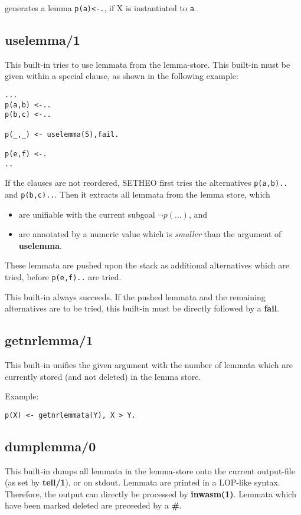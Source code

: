 generates a lemma {\tt p(a)<-.}, if X is instantiated to {\tt a}.


\subsection{uselemma/1}

This built-in tries to use lemmata from the lemma-store.
This built-in must be given within a special clause, as shown
in the following example:

\begin{verbatim}
...
p(a,b) <-..
p(b,c) <-..

p(_,_) <- uselemma(5),fail.

p(e,f) <-.
..
\end{verbatim}

If the clauses are not reordered, SETHEO first tries the alternatives
{\tt p(a,b)..} and {\tt p(b,c)..}.
Then it extracts all lemmata from the lemma store, which
\begin{itemize}
\item
are unifiable with the current subgoal $\neg p(\ldots)$, and
\item
are annotated by a numeric value which is {\em smaller} than the
argument of {\bf uselemma}.
\end{itemize}

These lemmata are pushed upon the stack as additional alternatives
which are tried, before {\tt p(e,f)..} are tried.

This built-in always succeeds. If the pushed lemmata and the remaining
alternatives are to be tried, this built-in must be directly followed
by a {\bf fail}.

\subsection{getnrlemma/1}

This built-in unifies the given argument with the number
of lemmata which are currently stored (and not deleted) in the
lemma store.

Example:
\begin{verbatim}
p(X) <- getnrlemmata(Y), X > Y.
\end{verbatim}

\subsection{dumplemma/0}

This built-in dumps all lemmata in the lemma-store
onto the current output-file (as set by {\bf tell/1}), or on
stdout.
Lemmata are printed in a LOP-like syntax. Therefore, the output can directly
be processed by {\bf inwasm(1)}.
Lemmata which have been marked deleted are preceeded by a {\bf \#}.

